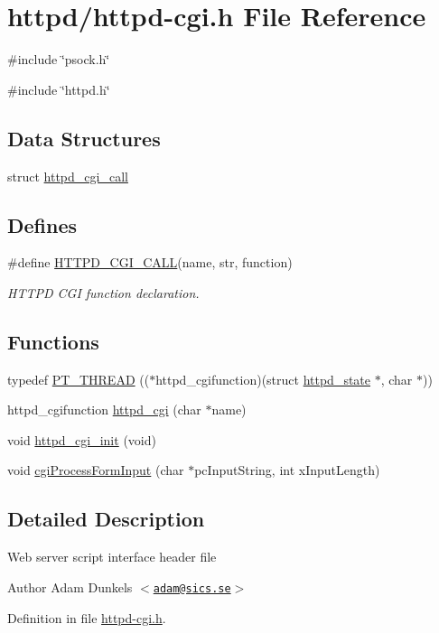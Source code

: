 \hypertarget{httpd-cgi_8h}{
\section{httpd/httpd-\/cgi.h File Reference}
\label{httpd-cgi_8h}
}
{\ttfamily \#include \char`\"{}psock.h\char`\"{}}\par
{\ttfamily \#include \char`\"{}httpd.h\char`\"{}}\par
\subsection*{Data Structures}
\begin{DoxyCompactItemize}
\item 
struct \hyperlink{structhttpd__cgi__call}{httpd\_\-cgi\_\-call}
\end{DoxyCompactItemize}
\subsection*{Defines}
\begin{DoxyCompactItemize}
\item 
\#define \hyperlink{group__httpd_ga1dbc635a2924806f42d7e3273a6a69b5}{HTTPD\_\-CGI\_\-CALL}(name, str, function)
\begin{DoxyCompactList}\small\item\em HTTPD CGI function declaration. \item\end{DoxyCompactList}\end{DoxyCompactItemize}
\subsection*{Functions}
\begin{DoxyCompactItemize}
\item 
typedef \hyperlink{group__httpd_ga0afadc47e9a9170ca311f854b9f07558}{PT\_\-THREAD} (($\ast$httpd\_\-cgifunction)(struct \hyperlink{structhttpd__state}{httpd\_\-state} $\ast$, char $\ast$))
\item 
httpd\_\-cgifunction \hyperlink{group__httpd_gae6f849e94cf6e214be8ffa9a548ecfcd}{httpd\_\-cgi} (char $\ast$name)
\item 
void \hyperlink{group__httpd_gac46af3a5a9d1d29778f9ce70b46d4d82}{httpd\_\-cgi\_\-init} (void)
\item 
void \hyperlink{group__httpd_ga4f9b39d727880fedab8fe2e4e2aafbf3}{cgiProcessFormInput} (char $\ast$pcInputString, int xInputLength)
\end{DoxyCompactItemize}


\subsection{Detailed Description}
Web server script interface header file \begin{DoxyAuthor}{Author}
Adam Dunkels $<$\href{mailto:adam@sics.se}{\tt adam@sics.se}$>$ 
\end{DoxyAuthor}


Definition in file \hyperlink{httpd-cgi_8h_source}{httpd-\/cgi.h}.

